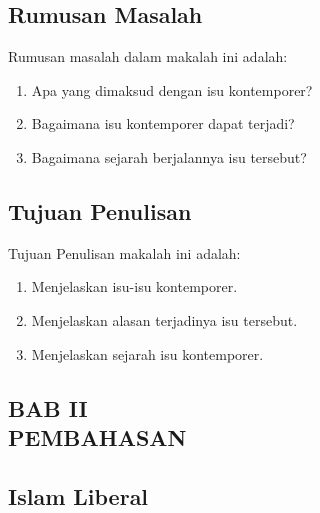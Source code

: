 \documentclass[a4paper,12 pt]{article}%
\begin{document}
\subsection{Rumusan Masalah}
Rumusan masalah dalam makalah ini adalah:
\begin{enumerate}
    \item Apa yang dimaksud dengan isu kontemporer?
    \item Bagaimana isu kontemporer dapat terjadi?
    \item Bagaimana sejarah berjalannya isu tersebut?
\end{enumerate}

\subsection{Tujuan Penulisan}
Tujuan Penulisan makalah ini adalah:
\begin{enumerate}
    \item Menjelaskan isu-isu kontemporer.
    \item Menjelaskan alasan terjadinya isu tersebut.
    \item Menjelaskan sejarah isu kontemporer.
\end{enumerate}
\clearpage

\begin{center}
    \section*{BAB II\\PEMBAHASAN}
\end{center}
\setcounter{subsection}{0}%

\subsection{Islam Liberal}
\end{document}
